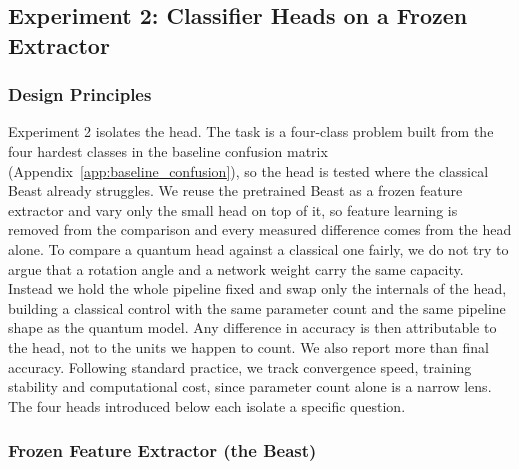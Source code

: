
\subsection{Experiment 2: Classifier Heads on a Frozen Extractor}
\label{sec:exp2_methods}

\subsubsection{Design Principles}
\label{sec:exp2_philosophy}

Experiment 2 isolates the head. The task is a four-class problem built from the four
hardest classes in the baseline confusion matrix
(Appendix~\ref{app:baseline_confusion}), so the head is tested where the classical Beast
already struggles. We reuse the pretrained Beast as a frozen feature extractor and vary
only the small head on top of it, so feature learning is removed from the comparison and
every measured difference comes from the head alone. To compare a
quantum head against a classical one fairly, we do not try to argue that a rotation angle
and a network weight carry the same capacity. Instead we hold the whole pipeline fixed
and swap only the internals of the head, building a classical control with the same
parameter count and the same pipeline shape as the quantum model. Any difference in
accuracy is then attributable to the head, not to the units we happen to count. We also
report more than final accuracy. Following standard practice, we track convergence speed,
training stability and computational cost, since parameter count alone is a narrow lens.
The four heads introduced below each isolate a specific question.

\subsubsection{Frozen Feature Extractor (the Beast)}
\label{sec:beast}

